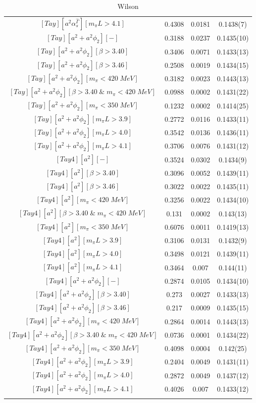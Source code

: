 \begin{longtable}{ c | c | c | c }
$[Tay][a^2\alpha_s^{\hat{\Gamma}}][m_{\pi}L>4.1]$ & 0.4308 & 0.0181 & 0.1438(7) \\
$[Tay][a^2+a^2\phi_2][-]$ & 0.3188 & 0.0237 & 0.1435(10) \\
$[Tay][a^2+a^2\phi_2][\beta>3.40]$ & 0.3406 & 0.0071 & 0.1433(13) \\
$[Tay][a^2+a^2\phi_2][\beta>3.46]$ & 0.2508 & 0.0019 & 0.1434(15) \\
$[Tay][a^2+a^2\phi_2][m_{\pi}<420\;MeV]$ & 0.3182 & 0.0023 & 0.1443(13) \\
$[Tay][a^2+a^2\phi_2][\beta>3.40\;\&\;m_{\pi}<420\;MeV]$ & 0.0988 & 0.0002 & 0.1431(22) \\
$[Tay][a^2+a^2\phi_2][m_{\pi}<350\;MeV]$ & 0.1232 & 0.0002 & 0.1414(25) \\
$[Tay][a^2+a^2\phi_2][m_{\pi}L>3.9]$ & 0.2772 & 0.0116 & 0.1433(11) \\
$[Tay][a^2+a^2\phi_2][m_{\pi}L>4.0]$ & 0.3542 & 0.0136 & 0.1436(11) \\
$[Tay][a^2+a^2\phi_2][m_{\pi}L>4.1]$ & 0.3706 & 0.0076 & 0.1431(12) \\
$[Tay4][a^2][-]$ & 0.3524 & 0.0302 & 0.1434(9) \\
$[Tay4][a^2][\beta>3.40]$ & 0.3096 & 0.0052 & 0.1439(11) \\
$[Tay4][a^2][\beta>3.46]$ & 0.3022 & 0.0022 & 0.1435(11) \\
$[Tay4][a^2][m_{\pi}<420\;MeV]$ & 0.3256 & 0.0022 & 0.1434(10) \\
$[Tay4][a^2][\beta>3.40\;\&\;m_{\pi}<420\;MeV]$ & 0.131 & 0.0002 & 0.143(13) \\
$[Tay4][a^2][m_{\pi}<350\;MeV]$ & 0.6076 & 0.0011 & 0.1419(13) \\
$[Tay4][a^2][m_{\pi}L>3.9]$ & 0.3106 & 0.0131 & 0.1432(9) \\
$[Tay4][a^2][m_{\pi}L>4.0]$ & 0.3498 & 0.0121 & 0.1439(11) \\
$[Tay4][a^2][m_{\pi}L>4.1]$ & 0.3464 & 0.007 & 0.144(11) \\
$[Tay4][a^2+a^2\phi_2][-]$ & 0.2874 & 0.0105 & 0.1434(10) \\
$[Tay4][a^2+a^2\phi_2][\beta>3.40]$ & 0.273 & 0.0027 & 0.1433(13) \\
$[Tay4][a^2+a^2\phi_2][\beta>3.46]$ & 0.217 & 0.0009 & 0.1435(15) \\
$[Tay4][a^2+a^2\phi_2][m_{\pi}<420\;MeV]$ & 0.2864 & 0.0014 & 0.1443(13) \\
$[Tay4][a^2+a^2\phi_2][\beta>3.40\;\&\;m_{\pi}<420\;MeV]$ & 0.0736 & 0.0001 & 0.1434(22) \\
$[Tay4][a^2+a^2\phi_2][m_{\pi}<350\;MeV]$ & 0.4098 & 0.0004 & 0.142(25) \\
$[Tay4][a^2+a^2\phi_2][m_{\pi}L>3.9]$ & 0.2404 & 0.0049 & 0.1431(11) \\
$[Tay4][a^2+a^2\phi_2][m_{\pi}L>4.0]$ & 0.2872 & 0.0049 & 0.1437(12) \\
$[Tay4][a^2+a^2\phi_2][m_{\pi}L>4.1]$ & 0.4026 & 0.007 & 0.1433(12) \\
\bottomrule
\caption{Wilson}
\end{longtable}

